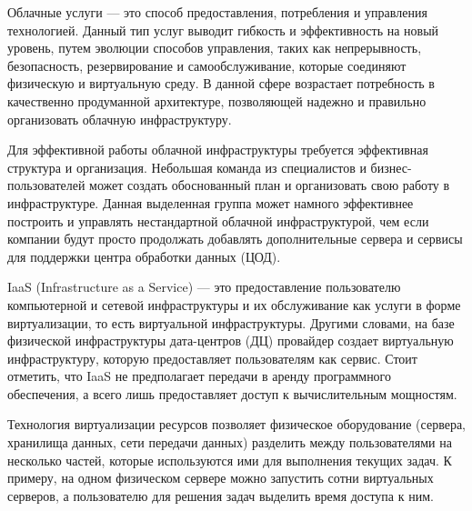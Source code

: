 
Облачные услуги --- это способ предоставления, потребления и управления технологией.
Данный тип услуг выводит гибкость и эффективность на новый уровень, путем эволюции способов управления, таких как непрерывность, безопасность, резервирование и самообслуживание, которые соединяют физическую и виртуальную среду.
В данной сфере возрастает потребность в качественно продуманной архитектуре, позволяющей надежно и правильно организовать облачную инфраструктуру.

Для эффективной работы облачной инфраструктуры требуется эффективная структура и организация.
Небольшая команда из специалистов и бизнес-пользователей может создать обоснованный план и организовать свою работу в инфраструктуре.
Данная выделенная группа может намного эффективнее построить и управлять нестандартной облачной инфраструктурой, чем если компании будут просто продолжать добавлять дополнительные сервера и сервисы для поддержки центра обработки данных (ЦОД).

IaaS (Infrastructure as a Service) --- это предоставление пользователю компьютерной и сетевой инфраструктуры и их обслуживание как услуги в форме виртуализации, то есть виртуальной инфраструктуры.
Другими словами, на базе физической инфраструктуры дата-центров (ДЦ) провайдер создает виртуальную инфраструктуру, которую предоставляет пользователям как сервис.
Стоит отметить, что IaaS не предполагает передачи в аренду программного обеспечения, а всего лишь предоставляет доступ к вычислительным мощностям.

Технология виртуализации ресурсов позволяет физическое оборудование (сервера, хранилища данных, сети передачи данных) разделить между пользователями на несколько частей, которые используются ими для выполнения текущих задач.
К примеру, на одном физическом сервере можно запустить сотни виртуальных серверов, а пользователю для решения задач выделить время доступа к ним.

\clearpage
